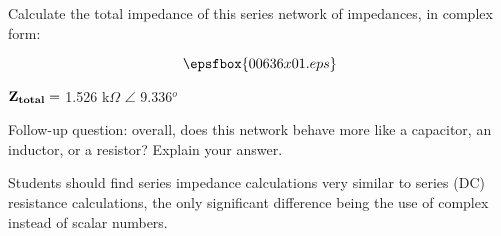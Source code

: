

Calculate the total impedance of this series network of impedances, in complex form:

$$\epsfbox{00636x01.eps}$$







${\bf Z_{total}} =$ 1.526 k$\Omega$ $\angle$ 9.336$^{o}$

\vskip 10pt

Follow-up question: overall, does this network behave more like a capacitor, an inductor, or a resistor?  Explain your answer.







Students should find series impedance calculations very similar to series (DC) resistance calculations, the only significant difference being the use of complex instead of scalar numbers.




